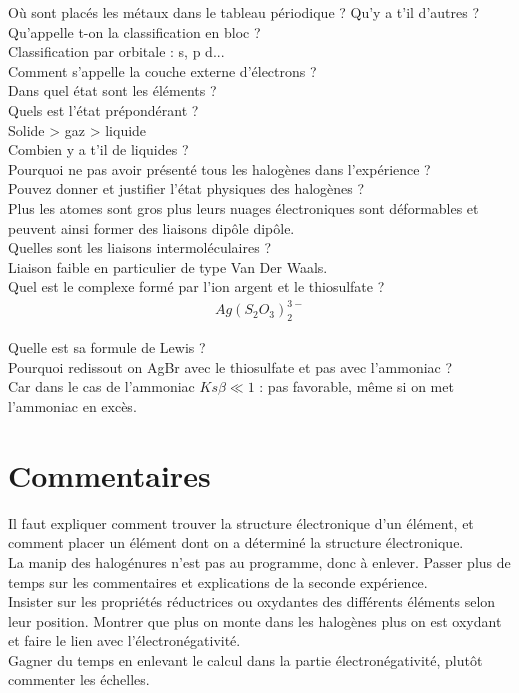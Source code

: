 \documentclass[12pt,prb,aps,epsf]{article}
\begin{document}
Où sont placés les métaux dans le tableau périodique ? Qu'y a t'il d'autres ?\\

Qu'appelle t-on la classification en bloc ?\\
Classification par orbitale : s, p d...\\

Comment s'appelle la couche externe d'électrons ?\\

Dans quel état sont les éléments ?\\

Quels est l'état prépondérant ?\\
Solide > gaz > liquide\\

Combien y a t'il de liquides ?\\

Pourquoi ne pas avoir présenté tous les halogènes dans l'expérience ?\\  

Pouvez donner et justifier l'état physiques des halogènes ?\\
Plus les atomes sont gros plus leurs nuages électroniques sont déformables et peuvent ainsi former des liaisons dipôle dipôle.\\

Quelles sont les liaisons intermoléculaires ?\\
Liaison faible en particulier de type Van Der Waals.\\
 
Quel est le complexe formé par l'ion argent et le thiosulfate ?
\begin{eqnarray}
Ag(S_2O_3)^{3-}_2
\end{eqnarray}

Quelle est sa formule de Lewis ?\\

Pourquoi redissout on AgBr avec le thiosulfate et pas avec l'ammoniac ?\\
Car dans le cas de l'ammoniac $Ks\beta \ll 1$ : pas favorable, même si on met l'ammoniac en excès.

\section*{Commentaires} 
Il faut expliquer comment trouver la structure électronique d'un élément, et comment placer un élément dont on a déterminé la structure électronique.\\
La manip des halogénures n'est pas au programme, donc à enlever. Passer plus de temps sur les commentaires et explications de la seconde expérience.\\
Insister sur les propriétés réductrices ou oxydantes des différents éléments selon leur position. Montrer que plus on monte dans les halogènes plus on est oxydant et faire le lien avec l'électronégativité.\\
Gagner du temps en enlevant le calcul dans la partie électronégativité, plutôt commenter les échelles.
\end{document}
